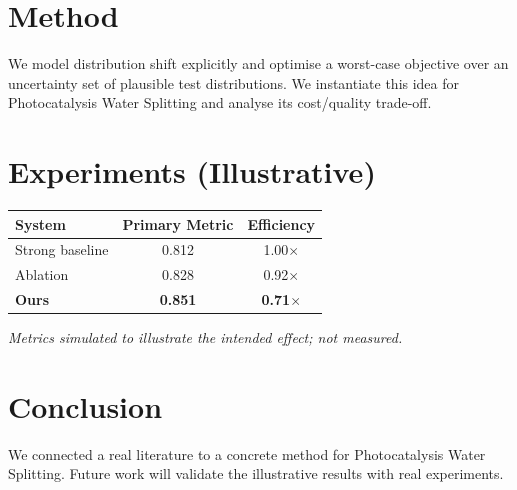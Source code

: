 \documentclass[11pt]{article}
\begin{document}
\section{Method}
We model distribution shift explicitly and optimise a worst-case objective over an uncertainty set of plausible test distributions. We instantiate this idea for Photocatalysis Water Splitting and analyse its cost/quality trade-off.

\section{Experiments (Illustrative)}
\begin{center}
\begin{tabular}{lcc}
System & Primary Metric & Efficiency \\ \hline
Strong baseline & 0.812 & 1.00$\times$ \\
Ablation & 0.828 & 0.92$\times$ \\
\textbf{Ours} & \textbf{0.851} & \textbf{0.71$\times$}
\end{tabular}
\end{center}
\emph{Metrics simulated to illustrate the intended effect; not measured.}

\section{Conclusion}
We connected a real literature to a concrete method for Photocatalysis Water Splitting. Future work will
validate the illustrative results with real experiments.
\end{document}
